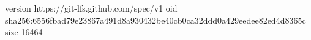 version https://git-lfs.github.com/spec/v1
oid sha256:6556fbad79e23867a491d8a930432be40cb0ca32ddd0a429eedee82ed4d8365c
size 16464
